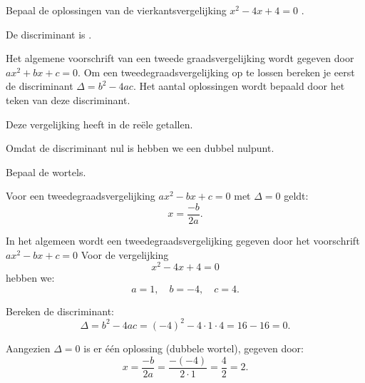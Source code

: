 \documentclass{ximera}
\begin{document}
\begin{exercise}

    Bepaal de oplossingen van de vierkantsvergelijking \( x^2 - 4x + 4 = 0 \) .

    
    \begin{question}
    De discriminant is \choicenul. 
    \begin{feedback}
        Het algemene voorschrift van een tweede graadsvergelijking wordt gegeven door  \(ax^2 + bx + c = 0\). 
        Om een tweedegraadsvergelijking op te lossen bereken je eerst de discriminant \(\Delta = b^2 - 4ac\). 
        Het aantal oplossingen wordt bepaald door het teken van deze discriminant. 
    \end{feedback}
    \end{question}
    
    \begin{question}
    Deze vergelijking heeft \choiceeen in de reële getallen. 
    \begin{feedback}
        Omdat de discriminant nul is hebben we een dubbel nulpunt. 
    \end{feedback}
    \end{question}
    
    \begin{question}
    Bepaal de wortels.
    \begin{hint}
        Voor een tweedegraadsvergelijking \(ax^2 - bx + c = 0\) met \(\Delta = 0\) geldt:
        \[
        x = \frac{-b}{2a}.
        \]
    \end{hint}
    \end{question}
    
    \begin{oplossing}
    In het algemeen wordt een tweedegraadsvergelijking gegeven door het voorschrift \( ax^2 - bx + c = 0 \) 
    Voor de vergelijking 
    \[
    x^2 - 4x + 4 = 0
    \]
    hebben we:
    \[
    a = 1,\quad b = -4,\quad c = 4.
    \]
    
    \vspace{3mm}
    
    Bereken de discriminant:
    \[
    \Delta = b^2 - 4ac = (-4)^2 - 4\cdot1\cdot4 = 16 - 16 = 0.
    \]
    
    Aangezien \(\Delta = 0\) is er één oplossing (dubbele wortel), gegeven door:
    \[
    x = \frac{-b}{2a} = \frac{-(-4)}{2\cdot1} = \frac{4}{2} = 2.
    \]
    
    \vspace{3mm}
    

\end{oplossing}
\end{exercise}
\end{document}
